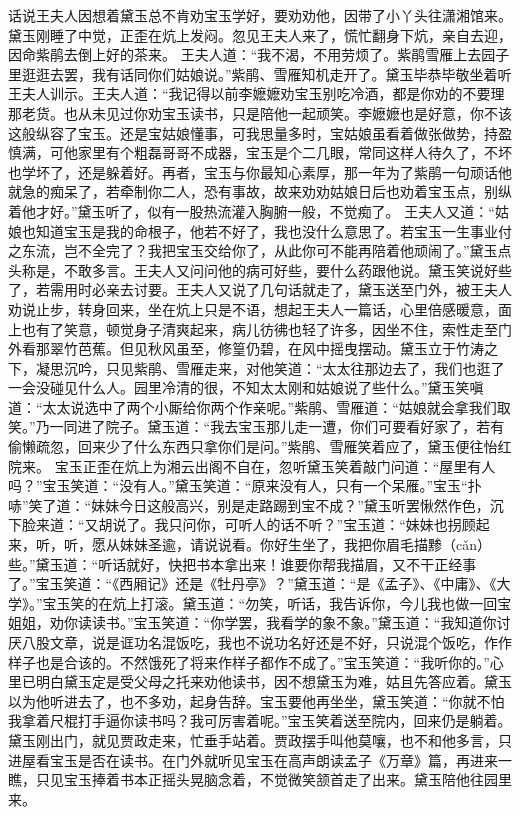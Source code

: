 \documentclass[12pt,oneside]{book}
\begin{document}
话说王夫人因想着黛玉总不肯劝宝玉学好，要劝劝他，因带了小丫头往潇湘馆来。黛玉刚睡了中觉，正歪在炕上发闷。忽见王夫人来了，慌忙翻身下炕，亲自去迎，因命紫鹃去倒上好的茶来。
王夫人道：“我不渴，不用劳烦了。紫鹃雪雁上去园子里逛逛去罢，我有话同你们姑娘说。”紫鹃、雪雁知机走开了。黛玉毕恭毕敬坐着听王夫人训示。王夫人道：“我记得以前李嬷嬷劝宝玉别吃冷酒，都是你劝的不要理那老货。也从未见过你劝宝玉读书，只是陪他一起顽笑。李嬷嬷也是好意，你不该这般纵容了宝玉。还是宝姑娘懂事，可我思量多时，宝姑娘虽看着做张做势，持盈慎满，可他家里有个粗磊哥哥不成器，宝玉是个二几眼，常同这样人待久了，不坏也学坏了，还是躲着好。再者，宝玉与你最知心素厚，那一年为了紫鹃一句顽话他就急的痴呆了，若牵制你二人，恐有事故，故来劝劝姑娘日后也劝着宝玉点，别纵着他才好。”黛玉听了，似有一股热流灌入胸腑一般，不觉痴了。
王夫人又道：“姑娘也知道宝玉是我的命根子，他若不好了，我也没什么意思了。若宝玉一生事业付之东流，岂不全完了？我把宝玉交给你了，从此你可不能再陪着他顽闹了。”黛玉点头称是，不敢多言。王夫人又问问他的病可好些，要什么药跟他说。黛玉笑说好些了，若需用时必亲去讨要。王夫人又说了几句话就走了，黛玉送至门外，被王夫人劝说止步，转身回来，坐在炕上只是不语，想起王夫人一篇话，心里倍感暖意，面上也有了笑意，顿觉身子清爽起来，病儿彷彿也轻了许多，因坐不住，索性走至门外看那翠竹芭蕉。但见秋风虽至，修篁仍碧，在风中摇曳摆动。黛玉立于竹涛之下，凝思沉吟，只见紫鹃、雪雁走来，对他笑道：“太太往那边去了，我们也逛了一会没碰见什么人。园里冷清的很，不知太太刚和姑娘说了些什么。”黛玉笑嗔道：“太太说选中了两个小厮给你两个作亲呢。”紫鹃、雪雁道：“姑娘就会拿我们取笑。”乃一同进了院子。黛玉道：“我去宝玉那儿走一遭，你们可要看好家了，若有偷懒疏忽，回来少了什么东西只拿你们是问。”紫鹃、雪雁笑着应了，黛玉便往怡红院来。
宝玉正歪在炕上为湘云出阁不自在，忽听黛玉笑着敲门问道：“屋里有人吗？”宝玉笑道：“没有人。”黛玉笑道：“原来没有人，只有一个呆雁。”宝玉“扑哧”笑了道：“妹妹今日这般高兴，别是走路踢到宝不成？”黛玉听罢愀然作色，沉下脸来道：“又胡说了。我只问你，可听人的话不听？”宝玉道：“妹妹也拐顾起来，听，听，愿从妹妹圣逾，请说说看。你好生坐了，我把你眉毛描黪（cǎn）些。”黛玉道：“听话就好，快把书本拿出来！谁要你帮我描眉，又不干正经事了。”宝玉笑道：“《西厢记》还是《牡丹亭》？”黛玉道：“是《孟子》、《中庸》、《大学》。”宝玉笑的在炕上打滚。黛玉道：“勿笑，听话，我告诉你，今儿我也做一回宝姐姐，劝你读读书。”宝玉笑道：“你学罢，我看学的象不象。”黛玉道：“我知道你讨厌八股文章，说是诓功名混饭吃，我也不说功名好还是不好，只说混个饭吃，作作样子也是合该的。不然饿死了将来作样子都作不成了。”宝玉笑道：“我听你的。”心里已明白黛玉定是受父母之托来劝他读书，因不想黛玉为难，姑且先答应着。黛玉以为他听进去了，也不多劝，起身告辞。宝玉要他再坐坐，黛玉笑道：“你就不怕我拿着尺棍打手逼你读书吗？我可厉害着呢。”宝玉笑着送至院内，回来仍是躺着。黛玉刚出门，就见贾政走来，忙垂手站着。贾政摆手叫他莫嚷，也不和他多言，只进屋看宝玉是否在读书。在门外就听见宝玉在高声朗读孟子《万章》篇，再进来一瞧，只见宝玉捧着书本正摇头晃脑念着，不觉微笑颔首走了出来。黛玉陪他往园里来。
\end{document}
